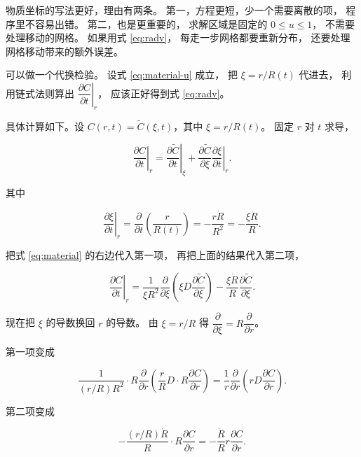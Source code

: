 物质坐标的写法更好，理由有两条。
第一，方程更短，少一个需要离散的项，
程序里不容易出错。
第二，也是更重要的，
求解区域是固定的 $0\le u\le1$，
不需要处理移动的网格。
如果用式 \eqref{eq:radv}，
每走一步网格都要重新分布，
还要处理网格移动带来的额外误差。

可以做一个代换检验。
设式 \eqref{eq:material-u} 成立，
把 $\xi=r/R(t)$ 代进去，
利用链式法则算出 $\left.\dfrac{\partial C}{\partial t}\right|_r$，
应该正好得到式 \eqref{eq:radv}。

具体计算如下。设 $C(r,t)=\tilde C(\xi,t)$，其中 $\xi=r/R(t)$。
固定 $r$ 对 $t$ 求导，

\begin{equation}
\left.\frac{\partial C}{\partial t}\right|_r
= \left.\frac{\partial \tilde C}{\partial t}\right|_\xi
+ \frac{\partial \tilde C}{\partial \xi}\left.\frac{\partial \xi}{\partial t}\right|_r .
\end{equation}

其中

\begin{equation}
\left.\frac{\partial \xi}{\partial t}\right|_r
= \frac{\partial}{\partial t}\left(\frac{r}{R(t)}\right)
= -\frac{r\dot R}{R^2} = -\frac{\xi\dot R}{R}.
\end{equation}

把式 \eqref{eq:material} 的右边代入第一项，
再把上面的结果代入第二项，

\begin{equation}
\left.\frac{\partial C}{\partial t}\right|_r
= \frac{1}{\xi R^2}\frac{\partial}{\partial \xi}\left(\xi D\frac{\partial \tilde C}{\partial \xi}\right)
- \frac{\xi\dot R}{R}\frac{\partial \tilde C}{\partial \xi}.
\end{equation}

现在把 $\xi$ 的导数换回 $r$ 的导数。
由 $\xi=r/R$ 得 $\dfrac{\partial}{\partial \xi}=R\dfrac{\partial}{\partial r}$。

第一项变成

\begin{equation}
\frac{1}{(r/R)R^2}\cdot R\frac{\partial}{\partial r}
\left(\frac{r}{R}D\cdot R\frac{\partial C}{\partial r}\right)
= \frac{1}{r}\frac{\partial}{\partial r}\left(rD\frac{\partial C}{\partial r}\right).
\end{equation}

第二项变成

\begin{equation}
-\frac{(r/R)\dot R}{R}\cdot R\frac{\partial C}{\partial r}
= -\frac{\dot R}{R}r\frac{\partial C}{\partial r}.
\end{equation}

